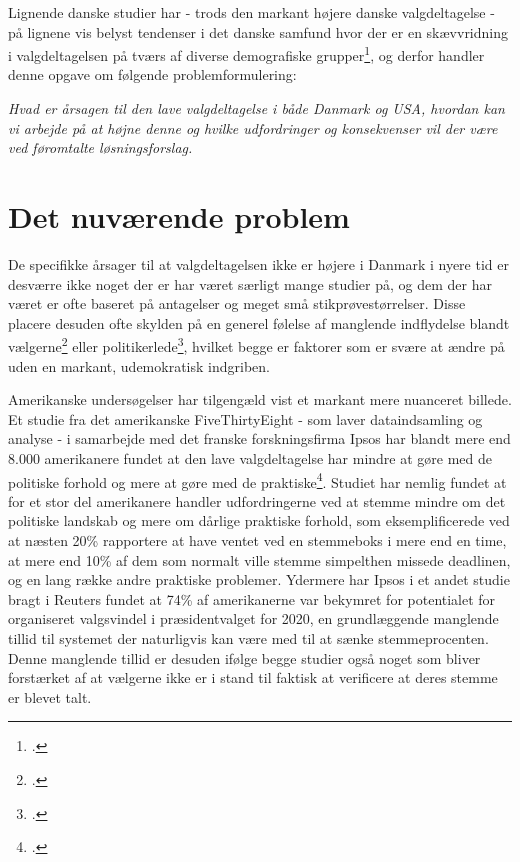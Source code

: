 \documentclass[a4paper, 8pt, oneside]{article} %
\begin{document}
Lignende danske studier har - trods den markant højere danske valgdeltagelse - på lignene vis belyst tendenser i det danske samfund hvor der er en skævvridning i valgdeltagelsen på tværs af diverse demografiske grupper\footcite{bhatti_hvem_2014}, og derfor handler denne opgave om følgende problemformulering:\\

\begin{center}
    \textit{\Large Hvad er årsagen til den lave valgdeltagelse i både Danmark og USA, hvordan kan vi arbejde på at højne denne og hvilke udfordringer og konsekvenser vil der være ved føromtalte løsningsforslag.}
\end{center}

\newpage

\section{Det nuværende problem}
De specifikke årsager til at valgdeltagelsen ikke er højere i Danmark i nyere tid er desværre ikke noget der er har været særligt mange studier på, og dem der har været er ofte baseret på antagelser og meget små stikprøvestørrelser. Disse placere desuden ofte skylden på en generel følelse af manglende indflydelse blandt vælgerne\footcite{noauthor_demokratiet_nodate} eller politikerlede\footcite{ejsing_stor_2015}, hvilket begge er faktorer som er svære at ændre på uden en markant, udemokratisk indgriben.

Amerikanske undersøgelser har tilgengæld vist et markant mere nuanceret billede. Et studie fra det amerikanske FiveThirtyEight - som laver dataindsamling og analyse - i samarbejde med det franske forskningsfirma Ipsos har blandt mere end 8.000 amerikanere fundet at den lave valgdeltagelse har mindre at gøre med de politiske forhold og mere at gøre med de praktiske\footcite{noauthor_why_2020}. Studiet har nemlig fundet at for et stor del amerikanere handler udfordringerne ved at stemme mindre om det politiske landskab og mere om dårlige praktiske forhold, som eksemplificerede ved at næsten 20\% rapportere at have ventet ved en stemmeboks i mere end en time, at mere end 10\% af dem som normalt ville stemme simpelthen missede deadlinen, og en lang række andre praktiske problemer. Ydermere har Ipsos i et andet studie bragt i Reuters fundet at 74\% af amerikanerne var bekymret for potentialet for organiseret valgsvindel i præsidentvalget for 2020, en grundlæggende manglende tillid til systemet der naturligvis kan være med til at sænke stemmeprocenten. Denne manglende tillid er desuden ifølge begge studier også noget som bliver forstærket af at vælgerne ikke er i stand til faktisk at verificere at deres stemme er blevet talt.
\end{document}
